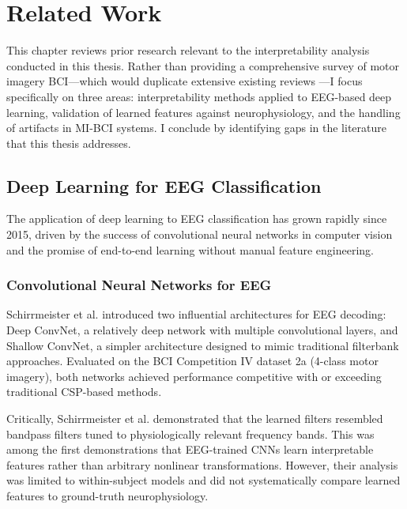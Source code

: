 \chapter{Related Work}
\label{ch:related_work}

This chapter reviews prior research relevant to the interpretability analysis conducted in this thesis. Rather than providing a comprehensive survey of motor imagery BCI—which would duplicate extensive existing reviews \cite{lotte2018review}—I focus specifically on three areas: interpretability methods applied to EEG-based deep learning, validation of learned features against neurophysiology, and the handling of artifacts in MI-BCI systems. I conclude by identifying gaps in the literature that this thesis addresses.


\section{Deep Learning for EEG Classification}
\label{sec:rw_deep_learning}

The application of deep learning to EEG classification has grown rapidly since 2015, driven by the success of convolutional neural networks in computer vision and the promise of end-to-end learning without manual feature engineering.


\subsection{Convolutional Neural Networks for EEG}
\label{subsec:rw_cnns}

Schirrmeister et al. \cite{schirrmeister2017deep} introduced two influential architectures for EEG decoding: Deep ConvNet, a relatively deep network with multiple convolutional layers, and Shallow ConvNet, a simpler architecture designed to mimic traditional filterbank approaches. Evaluated on the BCI Competition IV dataset 2a (4-class motor imagery), both networks achieved performance competitive with or exceeding traditional CSP-based methods.

Critically, Schirrmeister et al. demonstrated that the learned filters resembled bandpass filters tuned to physiologically relevant frequency bands. This was among the first demonstrations that EEG-trained CNNs learn interpretable features rather than arbitrary nonlinear transformations. However, their analysis was limited to within-subject models and did not systematically compare learned features to ground-truth neurophysiology.

